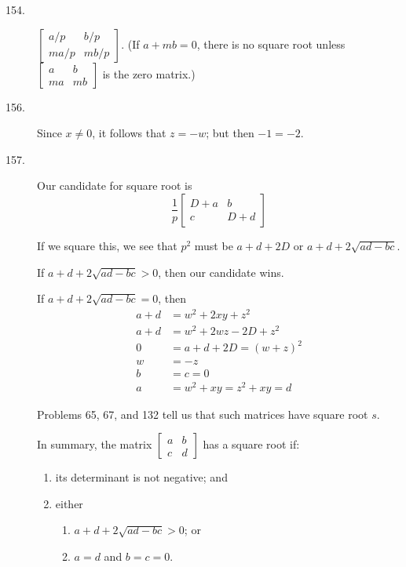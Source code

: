 \documentclass{article}
\begin{document}
\begin{description}
  \item[154.] $\begin{bmatrix} a/p & b/p \\ ma/p & mb/p \end{bmatrix}$. (If $a+mb=0$, there is no square root unless $\begin{bmatrix} a & b \\ ma & mb \end{bmatrix}$ is the zero matrix.)

  \item[156.] Since $x \neq 0$, it follows that $z = -w$; but then $-1 = -2$.

  \item[157.] Our candidate for square root is
    \begin{equation*}
    \frac{1}{p} \begin{bmatrix} D+a & b \\ c & D+d \end{bmatrix}
    \end{equation*}

    If we square this, we see that $p^2$ must be $a + d + 2D$ or $a + d + 2\sqrt{ad-bc}$.

    If $a + d + 2\sqrt{ad-bc} >0$, then our candidate wins.

    If $a + d + 2\sqrt{ad-bc} = 0$, then
    \begin{align*}
    a + d & = w^2 + 2xy + z^2 \\ 
    a + d & = w^2 + 2wz - 2D + z^2 \\
        0 & = a + d + 2D = (w+z)^2 \\
        w & = -z \\ 
        b & = c = 0 \\
        a & = w^2 + xy = z^2 + xy = d
    \end{align*}

    Problems 65, 67, and 132 tell us that such matrices have square root $s$.

    In summary, the matrix $\begin{bmatrix} a & b \\ c & d \end{bmatrix}$ has a square root if:
    \begin{enumerate}[\hspace{1cm}(1)]
      \item its determinant is not negative; and
      \item either 
        \begin{enumerate}[\hspace{1cm}(a)]
          \item $a + d + 2\sqrt{ad-bc} > 0$; or 
          \item $a = d$ and $b = c = 0$.
        \end{enumerate}
    \end{enumerate}


\end{description}
\end{document}
